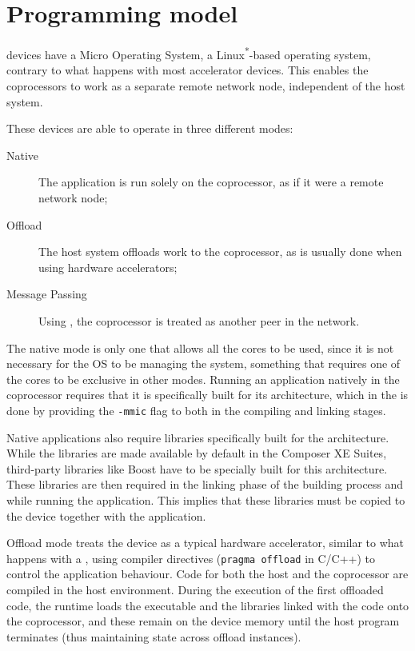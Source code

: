\documentclass[../thesis]{subfiles}
\begin{document}
	\section{Programming model}
	\label{sec:mic:programming}

	\intel\mic devices \cite{Intel:MIC:QuickStartGuide} have a Micro Operating System, a Linux\textsuperscript{*}-based operating system, contrary to what happens with most accelerator devices. This enables the coprocessors to work as a separate remote network node, independent of the host system.

	These devices are able to operate in three different modes:
		\begin{description}
			\item [Native] The application is run solely on the coprocessor, as if it were a remote network node;
			\item [Offload] The host system offloads work to the coprocessor, as is usually done when using hardware accelerators;
			\item [Message Passing] Using \mpi, the coprocessor is treated as another peer in the network.
		\end{description}

	The native mode is only one that allows all the cores to be used, since it is not necessary for the OS to be managing the system, something that requires one of the cores to be exclusive in other modes. Running an application natively in the coprocessor requires that it is specifically built for its architecture, which in the \icc is done by providing the \texttt{-mmic} flag to both in the compiling and linking stages.

	Native applications also require libraries specifically built for the \intel\mic architecture. While the \intel libraries are made available by default in the \intel Composer XE Suites, third-party libraries like Boost have to be specially built for this architecture. These libraries are then required in the linking phase of the building process and while running the application. This implies that these libraries must be copied to the device together with the application. 

	Offload mode treats the device as a typical hardware accelerator, similar to what happens with a \gpu, using compiler directives (\texttt{pragma offload} in C/C++) to control the application behaviour. Code for both the host and the coprocessor are compiled in the host environment. During the execution of the first offloaded code, the runtime loads the executable and the libraries linked with the code onto the coprocessor, and these remain on the device memory until the host program terminates (thus maintaining state across offload instances).
\end{document}
